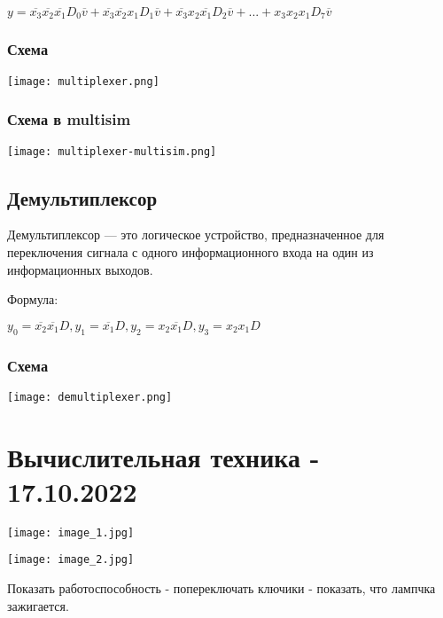 \documentclass{article}
\begin{document}
\begin{flushleft}
$y = \overline{x_3}\overline{x_2}\overline{x_1}D_0\overline{v} + \overline{x_3}\overline{x_2}x_1D_1\overline{v} + \overline{x_3}x_2\overline{x_1}D_2\overline{v} + ... + x_3x_2x_1D_7\overline{v}$

\subsubsection{Схема}

\texttt{[image: multiplexer.png]}

\subsubsection{Схема в multisim}

\texttt{[image: multiplexer-multisim.png]}

\subsection{Демультиплексор}

Демультиплексор — это логическое устройство, предназначенное для переключения сигнала с одного информационного входа на один из информационных выходов.

\hfill

Формула:

$y_0 = \overline{x_2} \overline{x_1} D, y_1 = \overline{x_1}D, y_2 = x_2\overline{x_1}D, y_3 = x_2 x_1 D$

\subsubsection{Схема}

\texttt{[image: demultiplexer.png]}

\pagebreak
\section{Вычислительная техника - 17.10.2022}

\texttt{[image: image\_1.jpg]}

\texttt{[image: image\_2.jpg]}

Показать работоспособность - попереключать ключики - показать, что лампчка зажигается.

\end{flushleft}
\end{document}
